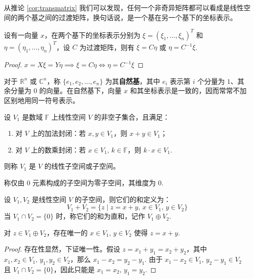 \begin{com}
从推论 \ref{cor:transmatrix} 我们可以发现，任何一个非奇异矩阵都可以看成是线性空间的两个基之间的过渡矩阵，换句话说，是一个基在另一个基下的坐标表示。
\end{com}

\begin{theorem}[向量在不同基下的坐标表示的关系]
设有一向量 $x$，在两个基下的坐标表示分别为 $\xi=(\xi_1,\ldots,\xi_n)^T$ 和 $\eta=(\eta_1,\ldots,\eta_n)^T$，设 $C$ 为过渡矩阵，则有 $\xi=C\eta$ 或 $\eta=C^{-1}\xi$.
\end{theorem}
\begin{proof}
$x=X\xi=Y\eta\implies\xi=C\eta\iff\eta=C^{-1}\xi$
\end{proof}

\begin{com}
对于 $\mathbb R^n$ 或 $\mathbb C^n$，称 $\{e_1,e_2,\ldots,e_n\}$ 为其\textbf{自然基}，其中 $e_i$ 表示第 $i$ 个分量为 $1$、其余分量为 $0$ 的向量。在自然基下，向量 $x$ 和其坐标表示是一致的，因而常常不加区别地用同一符号表示。
\end{com}

\begin{definition}[线性子空间]
设 $V_1$ 是数域 $\mathbb F$ 上线性空间 $V$ 的非空子集合，且满足：
\begin{enumerate}
    \item 对 $V$ 上的加法封闭：若 $x,y\in V_1$，则 $x+y\in V_1$；
    \item 对 $V$ 上的数乘封闭：若 $x\in V_1,\,k\in \mathbb F$，则 $k\cdot x\in V_1$.
\end{enumerate}
则称 $V_1$ 是 $V$ 的线性子空间或子空间。
\end{definition}

\begin{definition}[零子空间]
称仅由 $0$ 元素构成的子空间为零子空间，其维度为 0.
\end{definition}

\begin{definition}[子空间的和与直和]
设 $V_1,V_2$ 是线性空间 $V$ 的子空间，则它们的和定义为：
\[
    V_1+V_2=\{z\mid z=x+y,\,x\in V_1,\,y\in V_2\}
\]
当 $V_1\cap V_2=\{0\}$ 时，称它们的和为直和，记作 $V_1\oplus V_2$.
\end{definition}

\begin{theorem}
对 $z\in V_1\oplus V_2$，存在唯一的 $x\in V_1,\,y\in V_2$ 使得 $z=x+y$.
\end{theorem}
\begin{proof}
存在性显然，下证唯一性。假设 $z=x_1+y_1=x_2+y_2$，其中 $x_1,x_2\in V_1,\,y_1,y_2\in V_2$，那么 $x_1-x_2=y_2-y_1$. 由于 $x_1-x_2\in V_1,\,y_2-y_1\in V_2$ 且 $V_1\cap V_2=\{0\}$，因此只能是 $x_1=x_2,\,y_1=y_2$.
\end{proof}

